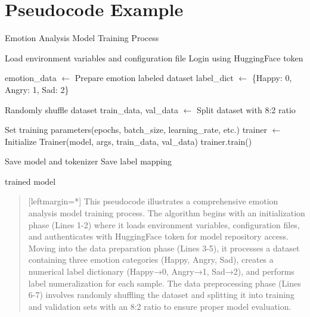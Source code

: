 \documentclass[journal]{IEEEtran}
\begin{document}
\section{Pseudocode Example}
\begin{algorithm}[htb]
\caption{Emotion Analysis Model Training Process}
\SetAlgoLined


\nl Load environment variables and configuration file\;
\nl Login using HuggingFace token\;

\nl emotion\_data $\leftarrow$ Prepare emotion labeled dataset 
\nl label\_dict $\leftarrow$ \{Happy: 0, Angry: 1, Sad: 2\}\;

\nl Randomly shuffle dataset\;
\nl train\_data, val\_data $\leftarrow$ Split dataset with 8:2 ratio\;



\nl Set training parameters(epochs, batch\_size, learning\_rate, etc.)\;
\nl trainer $\leftarrow$ Initialize Trainer(model, args, train\_data, val\_data)\;
\nl trainer.train()\;

\nl Save model and tokenizer\;
\nl Save label mapping\;

\KwRet trained model\;

\end{algorithm}
\begin{quote}[leftmargin=*]
This pseudocode illustrates a comprehensive emotion analysis model training process. The algorithm begins with an initialization phase (Lines 1-2) where it loads environment variables, configuration files, and authenticates with HuggingFace token for model repository access. Moving into the data preparation phase (Lines 3-5), it processes a dataset containing three emotion categories (Happy, Angry, Sad), creates a numerical label dictionary (Happy→0, Angry→1, Sad→2), and performs label numeralization for each sample. The data preprocessing phase (Lines 6-7) involves randomly shuffling the dataset and splitting it into training and validation sets with an 8:2 ratio to ensure proper model evaluation.\\
\end{quote}
\\
\end{document}
